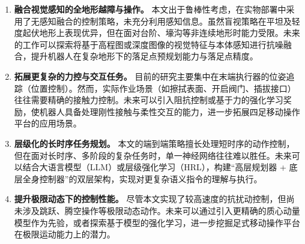 \begin{enumerate}
    \item \textbf{融合视觉感知的全地形越障与操作。}
          本文出于鲁棒性考虑，在实物部署中采用了无感知融合的控制策略，未充分利用感知信息。虽然盲视策略在平坦及轻度起伏地形上表现优异，但在面对台阶、壕沟等非连续地形时能力受限。未来的工作可以探索将基于高程图或深度图像的视觉特征与本体感知进行抗噪融合，提升机器人在复杂地形下的落足点预规划能力与落足点精度。

    \item \textbf{拓展更复杂的力控与交互任务。}
          目前的研究主要集中在末端执行器的位姿追踪（位置控制）。然而，实际作业场景（如擦拭表面、开启阀门、插拔接口）往往需要精确的接触力控制。未来可以引入阻抗控制或基于力的强化学习奖励，使机器人具备处理刚性接触与柔性交互的能力，进一步拓展四足移动操作平台的应用场景。

    \item \textbf{层级化的长时序任务规划。}
          本文的端到端策略擅长处理短时序的动作控制，但在面对长时序、多阶段的复杂任务时，单一神经网络往往难以胜任。未来可以结合大语言模型（LLM）或层级强化学习（HRL），构建“高层规划器 + 底层全身控制器”的双层架构，实现对更复杂语义指令的理解与执行。

    \item \textbf{提升极限动态下的控制性能。}
          尽管本文实现了较高速度的抗扰动控制，但尚未涉及跳跃、腾空操作等极限动态动作。未来可以通过引入更精确的质心动量模型作为先验，或者探索基于模型的强化学习，进一步挖掘足式移动操作平台在极限运动能力上的潜力。
\end{enumerate}
